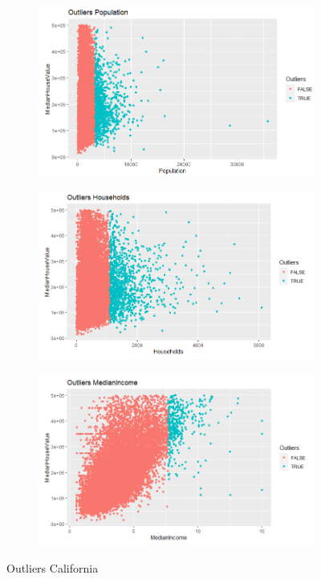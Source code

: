\begin{figure}[!tbh]
	\begin{subfigure}{0.5\textwidth}
		\includegraphics[width=1\linewidth]{figures/out_3}
		\caption{}
		\label{fig:out3}
	\end{subfigure}\hfil %
	\begin{subfigure}{0.5\textwidth}
		\includegraphics[width=1\linewidth]{figures/out_4}
		\caption{}
		\label{fig:out4}
	\end{subfigure}\hfil %

	\medskip
		\begin{subfigure}{0.5\textwidth}
	\centering
\includegraphics[width=1\linewidth]{figures/out_5}
\caption{}
\label{fig:out5}
	\end{subfigure}\hfil %
	
	\caption{Outliers California}
	\label{PCA_A}
\end{figure}





